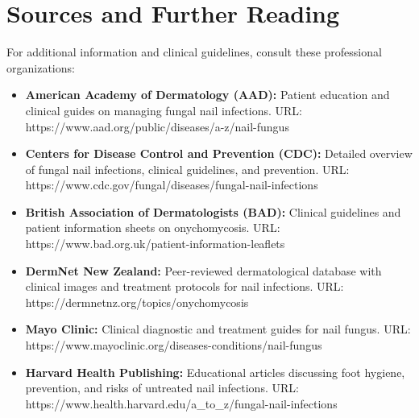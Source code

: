 \section*{Sources and Further Reading}
For additional information and clinical guidelines, consult these professional organizations:
\begin{itemize}
    \item \textbf{American Academy of Dermatology (AAD):} Patient education and clinical guides on managing fungal nail infections. URL: https://www.aad.org/public/diseases/a-z/nail-fungus
    \item \textbf{Centers for Disease Control and Prevention (CDC):} Detailed overview of fungal nail infections, clinical guidelines, and prevention. URL: https://www.cdc.gov/fungal/diseases/fungal-nail-infections
    \item \textbf{British Association of Dermatologists (BAD):} Clinical guidelines and patient information sheets on onychomycosis. URL: https://www.bad.org.uk/patient-information-leaflets
    \item \textbf{DermNet New Zealand:} Peer-reviewed dermatological database with clinical images and treatment protocols for nail infections. URL: https://dermnetnz.org/topics/onychomycosis
    \item \textbf{Mayo Clinic:} Clinical diagnostic and treatment guides for nail fungus. URL: https://www.mayoclinic.org/diseases-conditions/nail-fungus
    \item \textbf{Harvard Health Publishing:} Educational articles discussing foot hygiene, prevention, and risks of untreated nail infections. URL: https://www.health.harvard.edu/a\_to\_z/fungal-nail-infections
\end{itemize}